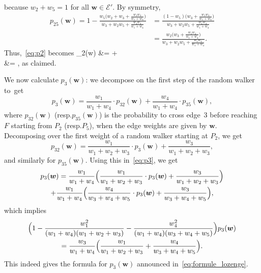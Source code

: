 \documentclass[11pt]{article}
\newcommand{\resp}{resp.\xspace}
\let\mathcal\mathscr
\def\ba#1\ea{\begin{align*}#1\end{align*}}
\numberwithin{equation}{section}
\theoremstyle{definition}
\let\bs\boldsymbol
\begin{document}
because $w_2 +w_5=1$ for all $\bs w\in\mathcal E'$.
By symmetry,
\begin{align*}
p_{25}(\bs w)= 1- \frac{w_5\big(w_2+w_3+\frac{w_1w_4}{w_1+w_4}\big)}{w_3+w_2w_5+\frac{w_1w_4}{w_1+w_4}}
&= \frac{(1-w_5)\big(w_3+\frac{w_1w_4}{w_1+w_4}\big)}{w_3+w_2w_5+\frac{w_1w_4}{w_1+w_4}}\\
&= \frac{w_2\big(w_3+\frac{w_1w_4}{w_1+w_4}\big)}{w_3+w_2w_5+\frac{w_1w_4}{w_1+w_4}}.
\end{align*}
Thus,~\eqref{eq:p2} becomes
\ba
p_2(\bs w)
&= \cdot {}
+\cdot{}\\
&= ,
\ea
as claimed.

We now calculate $p_3(\bs w)$: we decompose on the first step of the random walker to~get
\begin{equation}\label{eq:p3}
p_3(\bs w)
= \frac{w_1}{w_1+w_4}\cdot p_{32}(\bs w) + \frac{w_4}{w_1+w_4}\cdot p_{35}(\bs w),
\end{equation}
where $p_{32}(\bs w)$ (\resp $p_{35}(\bs w)$) is the probability to cross edge~$3$ before reaching $F$ starting from $P_2$ (\resp $P_5$), when the edge weights are given by $\bs w$.
Decomposing over the first weight of a random walker starting at $P_2$, we get
\[
p_{32}(\bs w) = \frac{w_1}{w_1+w_2+w_3}\cdot p_3(\bs w) + \frac{w_3}{w_1+w_2+w_3},
\]
and similarly for $p_{35}(\bs w)$.
Using this in~\eqref{eq:p3}, we get
\begin{multline*}
p_3(\bs w)
= \frac{w_1}{w_1+w_4}\Bigl(\frac{w_1}{w_1+w_2+w_3}\cdot p_3(\bs w) + \frac{w_3}{w_1+w_2+w_3} \Bigr)\\
+\frac{w_1}{w_1+w_4} \Bigl(\frac{w_4}{w_3+w_4+w_5}\cdot p_3(\bs w) + \frac{w_3}{w_3+w_4+w_5} \Bigr),
\end{multline*}
which implies
\begin{multline*}
\Bigl(1-\frac{w_1^2}{(w_1+w_4)(w_1+w_2+w_3)}-\frac{w_4^2}{(w_1+w_4)(w_3+w_4+w_5)} \Bigr)p_3(\bs w)\\
= \frac{w_3}{w_1+w_4} \Bigl(\frac{w_1}{w_1+w_2+w_3}+\frac{w_4}{w_3+w_4+w_5} \Bigr).
\end{multline*}
This indeed gives the formula for $p_3(\bs w)$ announced in~\eqref{eq:formule_lozenge}.
\end{document}
